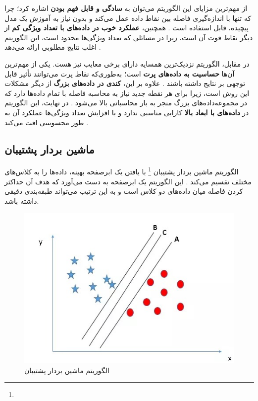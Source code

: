 از مهم‌ترین مزایای این الگوریتم می‌توان به \textbf{سادگی و قابل فهم بودن} اشاره کرد؛ چرا که تنها با اندازه‌گیری فاصله بین نقاط داده عمل می‌کند و بدون نیاز به آموزش یک مدل پیچیده، قابل استفاده است \cite{cover1967nearest}. همچنین، \textbf{عملکرد خوب در داده‌های با تعداد ویژگی کم} از دیگر نقاط قوت آن است، زیرا در مسائلی که تعداد ویژگی‌ها محدود است، این الگوریتم اغلب نتایج مطلوبی ارائه می‌دهد \cite{james2013introduction}.


در مقابل، الگوریتم نزدیک‌ترین همسایه دارای برخی معایب نیز هست. یکی از مهم‌ترین آن‌ها \textbf{حساسیت به داده‌های پرت} است؛ به‌طوری‌که نقاط پرت می‌توانند تأثیر قابل توجهی بر نتایج داشته باشند \cite{duda1973pattern}. علاوه بر این، \textbf{کندی در داده‌های بزرگ} از دیگر مشکلات این روش است، زیرا برای هر نقطه جدید نیاز به محاسبه فاصله با تمام داده‌ها دارد که در مجموعه‌داده‌های بزرگ منجر به بار محاسباتی بالا می‌شود \cite{mitchell1997machine}. در نهایت، این الگوریتم در \textbf{داده‌های با ابعاد بالا} کارایی مناسبی ندارد و با افزایش تعداد ویژگی‌ها عملکرد آن به طور محسوسی افت می‌کند \cite{murphy2012machine}.



\subsection{ماشین بردار پشتیبان}
الگوریتم ماشین بردار پشتیبان \footnote{} با یافتن یک ابرصفحه بهینه، داده‌ها را به کلاس‌های مختلف تقسیم می‌کند
\cite{cortes1995support,vapnik1998statistical}.
این الگوریتم یک ابرصفحه به دست می‌آورد که هدف آن حداکثر کردن فاصله میان داده‌های دو کلاس است و به این ترتیب می‌تواند طبقه‌بندی دقیقی داشته باشد.

\begin{figure}[h]
	\centering
	\begin{minipage}[b]{0.8\textwidth}
		\centering
		\includegraphics[width=\textwidth]{transformer_images/SVM_11zon.jpg}
		\caption{الگوریتم ماشین بردار پشتیبان}
		\label{fig:support vector machine}
	\end{minipage}
	\hfill
\end{figure}


